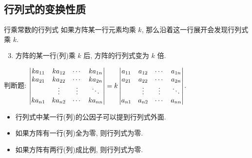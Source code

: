 \subsection{行列式的变换性质}
\begin{frame}{行乘常数的行列式}
	\onslide<+->
	如果方阵某一行元素均乘 $k$, 那么沿着这一行展开会发现行列式乘 $k$.
	\onslide<+->
	\begin{alertblock@}
		\begin{enumerate}
			\setcounter{enumi}{2}
			\item 方阵的某一行(列)乘 $k$ 后, 方阵的行列式变为 $k$ 倍.
		\end{enumerate}
	\end{alertblock@}
	\onslide<+->
	\begin{exercise}
		判断题: $\left|\begin{matrix}k a_{11}&k a_{12}&\cdots&k a_{1n}\\ka_{21}&ka_{22}&\cdots&k a_{2n}\\&\vdots&\vdots&\ddots\\k a_{n1}&ka_{n2}&\cdots&k a_{nn}\end{matrix}\right|=k\left|\begin{matrix}a_{11}&a_{12}&\cdots&a_{1n}\\a_{21}&a_{22}&\cdots&a_{2n}\\&\vdots&\vdots&\ddots\\a_{n1}&a_{n2}&\cdots&a_{nn}\end{matrix}\right|$. \visible<+->{\Huge\color{red}{$\times$}}
	\end{exercise}
	\onslide<+->
	\begin{corollary}
		\begin{itemize}
			\item 行列式中某一行(列)的公因子可以提到行列式外面.
			\item 如果方阵有一行(列)全为零, 则行列式为零.
			\item 如果方阵有两行(列)成比例, 则行列式为零.
		\end{itemize}
	\end{corollary}
\end{frame}


